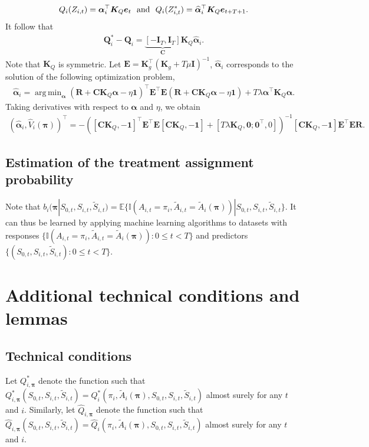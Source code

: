 \documentclass{article}
\DeclareMathOperator*{\argmin}{arg\,min}
\newcommand{\Mean}{{\mathbb{E}}}
\begin{document}
\begin{eqnarray*}
	Q_i(Z_{i,t})=\bm{\alpha}_i^\top \bm{K}_Q \bm{e}_t\,\,\,\,\hbox{and}\,\,\,\,Q_i(Z_{i,t}^*)=\widehat{\bm{\alpha}}_i^\top \bm{K}_Q \bm{e}_{t+T+1}.
\end{eqnarray*}
It follow that
\begin{eqnarray*}
	\bm{Q}_i^*-\bm{Q}_i=\underbrace{[-\bm{I}_{T}, \bm{I}_{T}]}_{\bm{C}}\bm{K}_Q \widehat{\bm{\alpha}}_i.
\end{eqnarray*}
Note that $\bm{K}_Q$ is symmetric. Let $\bm{E}=\bm{K}_g^\top (\bm{K}_g+T\mu \bm{I})^{-1}$, $\widehat{\bm{\alpha}}_i$ corresponds to the solution of the following optimization problem, 
\begin{eqnarray*}
	\widehat{\bm{\alpha}}_i=\argmin_{\bm{\alpha}} (\bm{R}+\bm{C} \bm{K}_Q \bm{\alpha}-\eta \bm{1})^\top \bm{E}^\top \bm{E} (\bm{R}+\bm{C} \bm{K}_Q \bm{\alpha}-\eta \bm{1})+T \lambda \bm{\alpha}^\top \bm{K}_Q \bm{\alpha}.
\end{eqnarray*}
Taking derivatives with respect to $\bm{\alpha}$ and $\eta$, we obtain
\begin{eqnarray*}
	(\widehat{\bm{\alpha}}_i,\widehat{V}_i(\bm{\pi}))^\top=-([\bm{C} \bm{K}_Q,-\bm{1}]^\top \bm{E}^\top \bm{E}[\bm{C} \bm{K}_Q,-\bm{1}]+[T\lambda \bm{K}_Q,\bm{0};\bm{0}^\top,0])^{-1}[\bm{C} \bm{K}_Q,-\bm{1}] \bm{E}^\top \bm{E} \bm{R}.
\end{eqnarray*}

\subsection{Estimation of the treatment assignment probability}\label{sec:propensity}
Note that $b_i(\bm{\pi}|S_{0,t},S_{i,t},\widetilde{S}_{i,t})=\Mean \{\mathbb{I}(A_{i,t}=\pi_i,\widetilde{A}_{i,t}=\widetilde{A}_i(\bm{\pi}))|S_{0,t},S_{i,t},\widetilde{S}_{i,t}\}$. It can thus be learned by applying machine learning algorithms to datasets with responses $\{ \mathbb{I}(A_{i,t}=\pi_i,\widetilde{A}_{i,t}=\widetilde{A}_i(\bm{\pi})):0\le t< T \}$ and predictors $\{(S_{0,t},S_{i,t},\widetilde{S}_{i,t}):0\le t<T\}$. 

\section{Additional technical conditions and lemmas}\label{sec:addtechcond}
\subsection{Technical conditions}
Let $Q_{i,\bm{\pi}}^*$ denote the function such that $Q_{i,\bm{\pi}}^*(S_{0,t},S_{i,t},\widetilde{S}_{i,t})=Q_i^*(\pi_i,\widetilde{A}_i(\bm{\pi}), S_{0,t},S_{i,t},\widetilde{S}_{i,t})$ almost surely for any $t$ and $i$. Similarly, let $\widehat{Q}_{i,\bm{\pi}}$ denote the function such that $\widehat{Q}_{i,\bm{\pi}}(S_{0,t},S_{i,t},\widetilde{S}_{i,t})=\widehat{Q}_i(\pi_i,\widetilde{A}_i(\bm{\pi}), S_{0,t},S_{i,t},\widetilde{S}_{i,t})$ almost surely for any $t$ and $i$.
\end{document}
